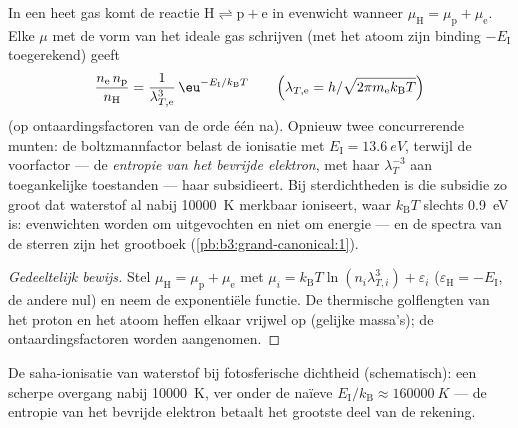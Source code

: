 \begin{proposition}\label{prop:b3:grand-canonical:saha}
In een heet gas komt de reactie $\text{H} \rightleftharpoons \text{p} +
\text{e}$ in evenwicht wanneer $\mu_{\text{H}} = \mu_{\text{p}} +
\mu_{\text{e}}$. Elke $\mu$ met de vorm van het ideale gas schrijven (met
het atoom zijn binding $-E_{\text{I}}$ toegerekend) geeft
\[
\frac{n_{\text{e}}\,n_{\text{p}}}{n_{\text{H}}}
 = \frac{1}{\lambda_{T,\text{e}}^3}\,
\eu^{-E_{\text{I}}/k_{\text{B}}T}
\qquad\Big(\lambda_{T,\text{e}} =
h/\sqrt{2\pi m_{\text{e}}k_{\text{B}}T}\Big)
\]
(op ontaardingsfactoren van de orde één na). Opnieuw twee concurrerende
munten: de boltzmannfactor belast de ionisatie met $E_{\text{I}} = \qty{13.6}{eV}$, terwijl de voorfactor --- de \emph{entropie van het
bevrijde elektron}, met haar $\lambda_T^{-3}$ aan toegankelijke toestanden
--- haar subsidieert. Bij sterdichtheden is die subsidie zo groot dat
waterstof al nabij \qty{10000}{K} merkbaar ioniseert, waar $k_{\text{B}}T$
slechts \qty{0.9}{eV} is: evenwichten worden om  uitgevochten
en niet om energie --- en de spectra van de sterren zijn het grootboek
(\cref{pb:b3:grand-canonical:1}).
\end{proposition}

\begin{proof}[Gedeeltelijk bewijs]
Stel $\mu_{\text{H}} = \mu_{\text{p}} + \mu_{\text{e}}$ met $\mu_i
= k_{\text{B}}T\ln(n_i\lambda_{T,i}^3) + \varepsilon_i$
($\varepsilon_{\text{H}} = -E_{\text{I}}$, de andere nul) en neem de
exponentiële functie. De thermische golflengten van het proton en het
atoom heffen elkaar vrijwel op (gelijke massa's); de ontaardingsfactoren
worden aangenomen.
\end{proof}

\begin{omfigure}

{\small De saha-ionisatie van waterstof bij fotosferische dichtheid
(schematisch): een scherpe overgang nabij \qty{10000}{K}, ver onder de
naïeve $E_{\text{I}}/k_{\text{B}} \approx \qty{160000}{K}$ --- de entropie
van het bevrijde elektron betaalt het grootste deel van de rekening.}
\end{omfigure}

